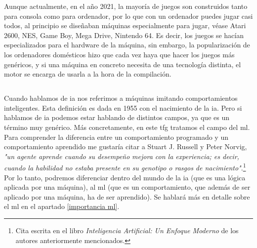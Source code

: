 Aunque actualmente, en el año 2021, la mayoría de juegos son construidos tanto para consola como para ordenador, por lo que con un ordenador puedes jugar casi todos, al principio se diseñaban máquinas especialmente para jugar, véase Atari 2600, NES, Game Boy, Mega Drive, Nintendo 64. Es decir, los juegos se hacían especializados para el hardware de la máquina, sin embargo, la popularización de los ordenadores domésticos hizo que cada vez haya que hacer los juegos más genéricos, y si una máquina en concreto necesita de una tecnología distinta, el motor se encarga de usarla a la hora de la compilación.

\subsection{}
Cuando hablamos de \gls{ia} nos referimos a máquinas imitando comportamientos inteligentes. Esta definición es dada en 1955 con el nacimiento de la \gls{ia}. Pero si hablamos de \gls{ia} podemos estar hablando de distintos campos, ya que es un término muy genérico. Más concretamente, en este \gls{tfg} tratamos el campo del \gls{ml}.
\\
Para comprender la diferencia entre un comportamiento programado y un comportamiento aprendido me gustaría citar a Stuart J. Russell y Peter Norvig, \textit{"un agente aprende cuando su desempeño mejora con la experiencia; es decir, cuando la habilidad no estaba presente en su genotipo o rasgos de nacimiento"}.\footnote{Cita escrita en el libro \textit{Inteligencia Artificial: Un Enfoque Moderno} de los autores anteriormente mencionados.} Por lo tanto, podremos diferenciar dentro del mundo de la \gls{ia} (que es una lógica aplicada por una máquina), al \gls{ml} (que es un comportamiento, que además de ser aplicado por una máquina, ha de ser aprendido). Se hablará más en detalle sobre el \gls{ml} en el apartado \ref{importancia ml}.

